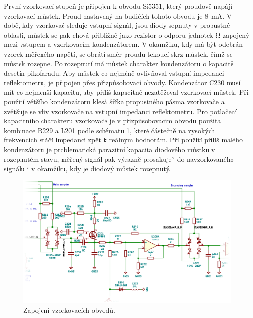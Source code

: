 První vzorkovací stupeň je připojen k obvodu Si5351, který proudově napájí vzorkovací můstek. Proud nastavený na budičích tohoto obvodu je \SI{8}{\milli\ampere}. V době, kdy vzorkovač sleduje vstupní signál, jsou diody sepnuty v propustné oblasti, můstek se pak chová přibližně jako rezistor o odporu jednotek \si{\ohm} zapojený mezi vstupem a vzorkovacím kondenzátorem. V okamžiku, kdy má být odebrán vzorek měřeného napětí, se obrátí směr proudu tekoucí skrz můstek, čímž se můstek rozepne. Po rozepnutí má můstek charakter kondenzátoru o kapacitě desetin pikofaradu. Aby můstek co nejméně ovlivňoval vstupní impedanci reflektometru, je připojen přes přizpůsobovací obvody. Kondenzátor C230 musí mít co nejmenší kapacitu, aby příliš kapacitně nezatěžoval vzorkovací můstek. Při použití většího kondenzátoru klesá šířka propustného pásma vzorkovače a zvětšuje se vliv vzorkovače na vstupní impedanci reflektometru. Pro potlačení kapacitního charakteru vzorkovače je v přizpůsobovacím obvodu použita kombinace R229 a L201 podle schématu \ref{sampler_section_schematic}, které částečně na vysokých frekvencích stáčí impedanci zpět k reálným hodnotám. Při použití příliš malého kondenzátoru je problematická parazitní kapacita diodového můstku v rozepnutém stavu, měřený signál pak výrazně \quotedblbase prosakuje\textquotedblleft{} do navzorkovaného signálu i v okamžiku, kdy je diodový můstek rozepnutý.

\begin{figure}[htbp]
\includegraphics[width=\textwidth,keepaspectratio]{images/sampler_section.eps}\caption{Zapojení vzorkovacích obvodů.}\label{sampler_section_schematic}
\end{figure}

